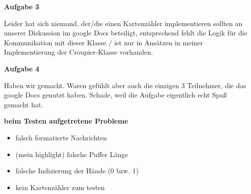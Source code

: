 \documentclass[a4paper, 12pt]{article}
\begin{document}
	\large
	\textbf{Aufgabe 3}\par
	\normalsize
	\vspace{12pt}
	Leider hat sich niemand, der/die einen Kartenzähler implementieren sollten an unserer Diskussion im google Docs beteiligt, entsprechend fehlt die Logik für die Kommunikation mit dieser Klasse / ist nur in Ansätzen in meiner Implementierung der Croupier-Klasse vorhanden.\par
	\vspace{24pt}
	\newpage
	
	\large
	\textbf{Aufgabe 4}\par
	\normalsize
	\vspace{12pt}
	
	Haben wir gemacht. Waren gefühlt aber auch die einzigen 3 Teilnehmer, die das google Docs genutzt haben. Schade, weil die Aufgabe eigentlich echt Spaß gemacht hat.\par
	\vspace{12pt}
	\textbf{beim Testen aufgetretene Probleme}
	\begin{itemize}
		\item falsch formatierte Nachrichten
		\item (mein highlight) falsche Puffer Länge
		\item falsche Indizierung der Hände (0 bzw. 1)
		\item kein Kartenzähler zum testen
	\end{itemize}
	
	
\end{document}

